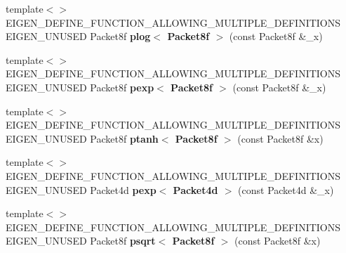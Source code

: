 \begin{DoxyCompactItemize}
\item 
\mbox{\label{namespace_eigen_1_1internal_a22506371c12a3a9b33a9ef4ee1224ccf}} 
{\footnotesize template$<$$>$ }\\E\+I\+G\+E\+N\+\_\+\+D\+E\+F\+I\+N\+E\+\_\+\+F\+U\+N\+C\+T\+I\+O\+N\+\_\+\+A\+L\+L\+O\+W\+I\+N\+G\+\_\+\+M\+U\+L\+T\+I\+P\+L\+E\+\_\+\+D\+E\+F\+I\+N\+I\+T\+I\+O\+NS E\+I\+G\+E\+N\+\_\+\+U\+N\+U\+S\+ED Packet8f {\bfseries plog$<$ Packet8f $>$} (const Packet8f \&\+\_\+x)
\item 
\mbox{\label{namespace_eigen_1_1internal_af5c77669e4c0a48e32f5d45c6a1aa9e8}} 
{\footnotesize template$<$$>$ }\\E\+I\+G\+E\+N\+\_\+\+D\+E\+F\+I\+N\+E\+\_\+\+F\+U\+N\+C\+T\+I\+O\+N\+\_\+\+A\+L\+L\+O\+W\+I\+N\+G\+\_\+\+M\+U\+L\+T\+I\+P\+L\+E\+\_\+\+D\+E\+F\+I\+N\+I\+T\+I\+O\+NS E\+I\+G\+E\+N\+\_\+\+U\+N\+U\+S\+ED Packet8f {\bfseries pexp$<$ Packet8f $>$} (const Packet8f \&\+\_\+x)
\item 
\mbox{\label{namespace_eigen_1_1internal_a8c1fea674ea6c3cc4c439f306e00dafb}} 
{\footnotesize template$<$$>$ }\\E\+I\+G\+E\+N\+\_\+\+D\+E\+F\+I\+N\+E\+\_\+\+F\+U\+N\+C\+T\+I\+O\+N\+\_\+\+A\+L\+L\+O\+W\+I\+N\+G\+\_\+\+M\+U\+L\+T\+I\+P\+L\+E\+\_\+\+D\+E\+F\+I\+N\+I\+T\+I\+O\+NS E\+I\+G\+E\+N\+\_\+\+U\+N\+U\+S\+ED Packet8f {\bfseries ptanh$<$ Packet8f $>$} (const Packet8f \&x)
\item 
\mbox{\label{namespace_eigen_1_1internal_aa287cf9beefe00a71e537d61ca5e374d}} 
{\footnotesize template$<$$>$ }\\E\+I\+G\+E\+N\+\_\+\+D\+E\+F\+I\+N\+E\+\_\+\+F\+U\+N\+C\+T\+I\+O\+N\+\_\+\+A\+L\+L\+O\+W\+I\+N\+G\+\_\+\+M\+U\+L\+T\+I\+P\+L\+E\+\_\+\+D\+E\+F\+I\+N\+I\+T\+I\+O\+NS E\+I\+G\+E\+N\+\_\+\+U\+N\+U\+S\+ED Packet4d {\bfseries pexp$<$ Packet4d $>$} (const Packet4d \&\+\_\+x)
\item 
\mbox{\label{namespace_eigen_1_1internal_ac640b3ddd9636a8aa41e43127d5a603d}} 
{\footnotesize template$<$$>$ }\\E\+I\+G\+E\+N\+\_\+\+D\+E\+F\+I\+N\+E\+\_\+\+F\+U\+N\+C\+T\+I\+O\+N\+\_\+\+A\+L\+L\+O\+W\+I\+N\+G\+\_\+\+M\+U\+L\+T\+I\+P\+L\+E\+\_\+\+D\+E\+F\+I\+N\+I\+T\+I\+O\+NS E\+I\+G\+E\+N\+\_\+\+U\+N\+U\+S\+ED Packet8f {\bfseries psqrt$<$ Packet8f $>$} (const Packet8f \&x)

\end{DoxyCompactItemize}
